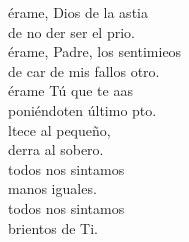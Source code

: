 \begin{cancion}%
	érame, Dios de la astia\\
	de no der ser el prio.\\
	érame, Padre,  los sentimieos\\
	de car de mis fallos otro.\\
	érame Tú que te aas\\
	poniéndoten último pto.\\
	ltece al pequeño, \\
	derra al sobero.\\
	 todos nos sintamos \\
	manos iguales.\\
	 todos nos sintamos\\
	brientos de Ti.\\
\end{cancion}%
